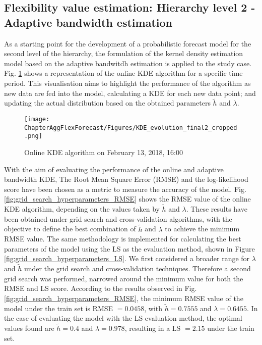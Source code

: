 \subsection{Flexibility value estimation: Hierarchy level 2 - Adaptive bandwidth estimation}\label{Sect:ResultsLevel2AdaptiveBandwidth}

As a starting point for the development of a probabilistic forecast model for the second level of the hierarchy, the formulation of the kernel density estimation model based on the adaptive bandwitdh estimation is applied to the study case.
Fig. \ref{fig:KDE_EVOLUTION1} shows a representation of the online KDE algorithm for a specific time period. This visualisation aims to highlight the performance of the algorithm as new data are fed into the model, calculating a KDE for each new data point; and updating the actual distribution based on the obtained parameters $\widetilde{h}$ and $\lambda$. 

\begin{figure}[!ht]
\centerline{\texttt{[image: ChapterAggFlexForecast/Figures/KDE\_evolution\_final2\_cropped.png]}}
\caption{Online KDE algorithm on February 13, 2018, 16:00}
\label{fig:KDE_EVOLUTION1}
\end{figure}

With the aim of evaluating the performance of the online and adaptive bandwidth KDE, The Root Mean Square Error (RMSE) and the log-likelihood score have been chosen as a metric to measure the accuracy of the model. Fig. \ref{fig:grid_search_hyperparameters_RMSE} shows the RMSE value of the online KDE algorithm, depending on the values taken by $\widetilde{h}$ and $\lambda$. These results have been obtained under grid search and cross-validation algorithms, with the objective to define the best combination of $\widetilde{h}$ and $\lambda$ to achieve the minimum RMSE value. The same methodology is implemented for calculating the best parameters of the model using the LS as the evaluation method, shown in Figure \ref{fig:grid_search_hyperparameters_LS}. We first considered a broader range for $\lambda$ and $\widetilde{h}$ under the grid search and cross-validation techniques. Therefore a second grid search was performed, narrowed around the minimum value for both the RMSE and LS score. According to the results observed in Fig. \ref{fig:grid_search_hyperparameters_RMSE}, the minimum RMSE value of the model under the train set is RMSE $= 0.0458$, with $\widetilde{h}=0.7555$ and $\lambda=0.6455$. In the case of evaluating the model with the LS evaluation method, the optimal values found are $\widetilde{h}=0.4$ and $\lambda=0.978$, resulting in a LS $=2.15$ under the train set.

